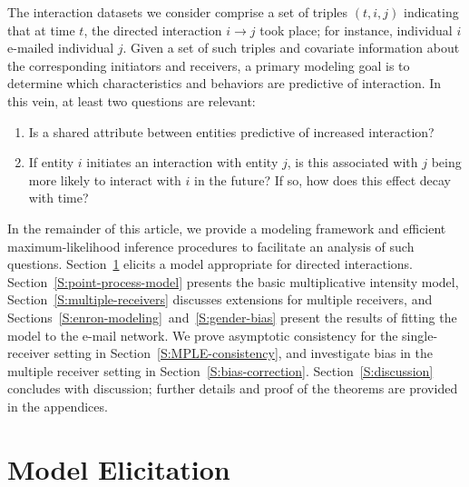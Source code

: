 \documentclass[aoas,preprint]{imsart}
\begin{document}
The interaction datasets we consider comprise a set of triples $(t,i,j)$ indicating that at time $t$, the directed interaction $i\rightarrow j$ took place; for instance, individual $i$ e-mailed individual $j$.  Given a set of such triples and covariate information about the corresponding initiators and receivers, a primary modeling goal is to determine which characteristics and behaviors are predictive of interaction.  In this vein, at least two questions are relevant:

\begin{enumerate}
    \item Is a shared attribute between entities predictive of increased
    interaction?

    \item If entity $i$ initiates an interaction with entity $j$, is this
    associated with $j$ being more likely to interact with $i$ in the future?
    If so, how does this effect decay with time?
\end{enumerate}


In the remainder of this article, we provide a modeling framework and efficient maximum-likelihood inference procedures to facilitate an analysis of such questions.  Section~\ref{S:model-elicitation} elicits a model appropriate for directed interactions.
Section~\ref{S:point-process-model} presents the basic multiplicative
intensity model,
Section~\ref{S:multiple-receivers} discusses extensions for multiple
receivers, and Sections~\ref{S:enron-modeling}~and~\ref{S:gender-bias}
present the results of fitting the model to the e-mail network.  We
prove asymptotic consistency for the single-receiver setting in
Section~\ref{S:MPLE-consistency}, and investigate bias in the multiple
receiver setting in Section~\ref{S:bias-correction}.
Section~\ref{S:discussion} concludes with discussion; further details and
proof of the theorems are provided in the appendices.

\section{Model Elicitation}\label{S:model-elicitation}
\end{document}

